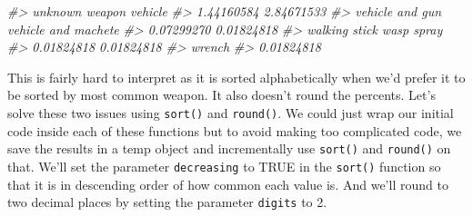 \documentclass[
  12pt,
]{book}
\newenvironment{Shaded}{\begin{snugshade}}{\end{snugshade}}
\newcommand{\CommentTok}[1]{\textcolor[rgb]{0.37,0.37,0.37}{\textit{#1}}}
\begin{document}
\begin{Shaded}
\begin{Highlighting}[]
\CommentTok{\#>                   unknown weapon                          vehicle }
\CommentTok{\#>                       1.44160584                       2.84671533 }
\CommentTok{\#>                  vehicle and gun              vehicle and machete }
\CommentTok{\#>                       0.07299270                       0.01824818 }
\CommentTok{\#>                    walking stick                       wasp spray }
\CommentTok{\#>                       0.01824818                       0.01824818 }
\CommentTok{\#>                           wrench }
\CommentTok{\#>                       0.01824818}
\end{Highlighting}
\end{Shaded}

This is fairly hard to interpret as it is sorted alphabetically when we'd prefer it to be sorted by most common weapon. It also doesn't round the percents. Let's solve these two issues using \texttt{sort()} and \texttt{round()}. We could just wrap our initial code inside each of these functions but to avoid making too complicated code, we save the results in a temp object and incrementally use \texttt{sort()} and \texttt{round()} on that. We'll set the parameter \texttt{decreasing} to TRUE in the \texttt{sort()} function so that it is in descending order of how common each value is. And we'll round to two decimal places by setting the parameter \texttt{digits} to 2.
\end{document}
